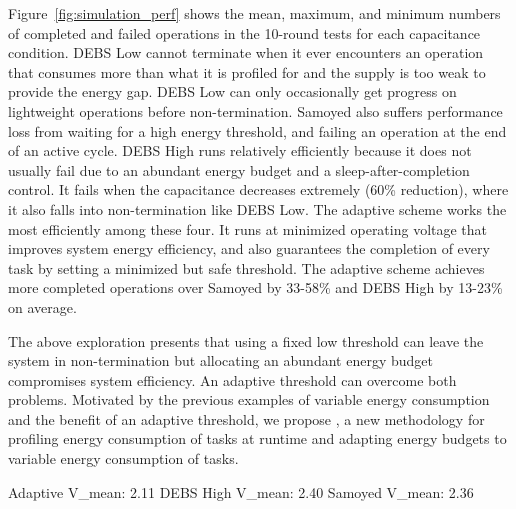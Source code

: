 

Figure~\ref{fig:simulation_perf} shows the mean, maximum, and minimum numbers of completed and failed operations in the 10-round tests for each capacitance condition. 
DEBS Low cannot terminate when it ever encounters an operation that consumes more than what it is profiled for and the supply is too weak to provide the energy gap. 
DEBS Low can only occasionally get progress on lightweight operations before non-termination. 
Samoyed also suffers performance loss from waiting for a high energy threshold, and failing an operation at the end of an active cycle. 
DEBS High runs relatively efficiently because it does not usually fail due to an abundant energy budget and a sleep-after-completion control. 
It fails when the capacitance decreases extremely (60\% reduction), where it also falls into non-termination like DEBS Low.  
The adaptive scheme works the most efficiently among these four.
It runs at minimized operating voltage that improves system energy efficiency, and also guarantees the completion of every task by setting a minimized but safe threshold.
The adaptive scheme achieves more completed operations over Samoyed by 33-58\% and DEBS High by 13-23\% on average.

The above exploration presents that using a fixed low threshold can leave the system in non-termination but allocating an abundant energy budget compromises system efficiency. 
An adaptive threshold can overcome both problems.
Motivated by the previous examples of variable energy consumption and the benefit of an adaptive threshold, we propose \nn{}, a new methodology for profiling energy consumption of tasks at runtime and adapting energy budgets to variable energy consumption of tasks. 

Adaptive V\_mean: 2.11
DEBS High V\_mean: 2.40
Samoyed V\_mean: 2.36